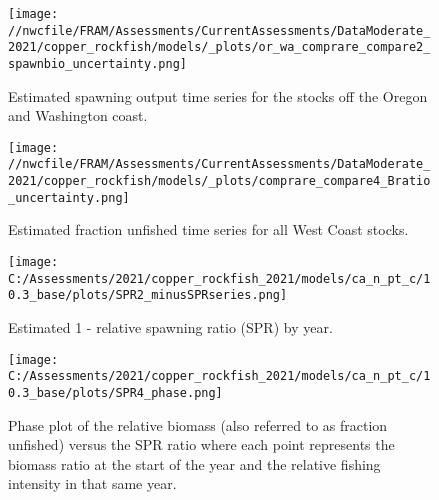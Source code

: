 \documentclass[11pt,
  english,
  a4paper,
]{article}
\begin{document}

\begin{figure}
\centering
\texttt{[image: //nwcfile/FRAM/Assessments/CurrentAssessments/DataModerate\_2021/copper\_rockfish/models/\_plots/or\_wa\_comprare\_compare2\_spawnbio\_uncertainty.png]}
\caption{Estimated spawning output time series for the stocks off the Oregon and Washington coast.\label{fig:ssb-orwa-compare}}
\end{figure}

\tagmcend\tagstructend


\begin{figure}
\centering
\texttt{[image: //nwcfile/FRAM/Assessments/CurrentAssessments/DataModerate\_2021/copper\_rockfish/models/\_plots/comprare\_compare4\_Bratio\_uncertainty.png]}
\caption{Estimated fraction unfished time series for all West Coast stocks.\label{fig:depl-compare}}
\end{figure}

\tagmcend\tagstructend

\clearpage


\begin{figure}
\centering
\texttt{[image: C:/Assessments/2021/copper\_rockfish\_2021/models/ca\_n\_pt\_c/10.3\_base/plots/SPR2\_minusSPRseries.png]}
\caption{Estimated 1 - relative spawning ratio (SPR) by year.\label{fig:1-spr}}
\end{figure}

\tagmcend\tagstructend


\begin{figure}
\centering
\texttt{[image: C:/Assessments/2021/copper\_rockfish\_2021/models/ca\_n\_pt\_c/10.3\_base/plots/SPR4\_phase.png]}
\caption{Phase plot of the relative biomass (also referred to as fraction unfished) versus the SPR ratio where each point represents the biomass ratio at the start of the year and the relative fishing intensity in that same year.\label{fig:phase}}
\end{figure}

\tagmcend\tagstructend
\end{document}
